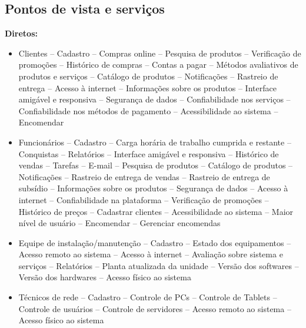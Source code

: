 \subsection{Pontos de vista e serviços}
\textbf{Diretos:}
\begin{itemize}
	\item Clientes 
		\subitem-- Cadastro
		\subitem -- Compras online
		\subitem -- Pesquisa de produtos
		\subitem -- Verificação de promoções
		\subitem -- Histórico de compras
		\subitem -- Contas a pagar
		\subitem -- Métodos avaliativos de produtos e serviços
		\subitem -- Catálogo de produtos
		\subitem -- Notificações 
		\subitem -- Rastreio de entrega
		\subitem -- Acesso à internet
		\subitem -- Informações sobre os produtos
		\subitem -- Interface amigável e responsiva 
		\subitem -- Segurança de dados
		\subitem -- Confiabilidade nos serviços 
		\subitem -- Confiabilidade nos métodos de pagamento
		\subitem -- Acessibilidade ao sistema
		\subitem -- Encomendar
	\item Funcionários
		\subitem-- Cadastro
		\subitem -- Carga horária de trabalho cumprida e restante 
		\subitem -- Conquistas 
		\subitem -- Relatórios
		\subitem -- Interface amigável e responsiva 
		\subitem -- Histórico de vendas
		\subitem -- Tarefas
		\subitem -- E-mail
		\subitem -- Pesquisa de produtos
		\subitem -- Catálogo de produtos
		\subitem -- Notificações 
		\subitem -- Rastreio de entrega de vendas
		\subitem -- Rastreio de entrega de subsídio
		\subitem -- Informações sobre os produtos
		\subitem -- Segurança de dados
		\subitem -- Acesso à internet
		\subitem -- Confiabilidade na plataforma
		\subitem -- Verificação de promoções
		\subitem -- Histórico de preços
		\subitem -- Cadastrar clientes
		\subitem -- Acessibilidade ao sistema
		\subitem -- Maior nível de usuário
		\subitem -- Encomendar
		\subitem -- Gerenciar encomendas
	\item Equipe de instalação/manutenção 
		\subitem -- Cadastro
		\subitem -- Estado dos equipamentos
		\subitem -- Acesso remoto ao sistema
		\subitem -- Acesso à internet
		\subitem -- Avaliação sobre sistema e serviços
		\subitem -- Relatórios 
		\subitem -- Planta atualizada da unidade
		\subitem -- Versão dos softwares
		\subitem -- Versão dos hardwares
		\subitem -- Acesso físico ao sistema
	\item Técnicos de rede
		\subitem -- Cadastro
		\subitem -- Controle de PCs
		\subitem -- Controle de Tablets
		\subitem -- Controle de usuários
		\subitem -- Controle de servidores
		\subitem -- Acesso remoto ao sistema
		\subitem -- Acesso físico ao sistema

\end{itemize}
